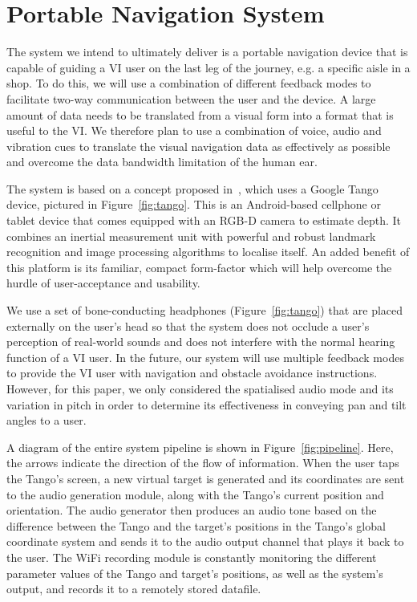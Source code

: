 \documentclass[format=sigconf, review=true, screen=true, anonymous=true]{acmart}
\begin{document}
\section{Portable Navigation System}
\label{sec:portable-navigation}

The system we intend to ultimately deliver is a portable navigation device that is capable of guiding a VI user on the last leg of the journey, e.g. a specific aisle in a shop. To do this, we will use a combination of different feedback modes to facilitate two-way communication between the user and the device. A large amount of data needs to be translated from a visual form into a format that is useful to the VI. We therefore plan to use a combination of voice, audio and vibration cues to translate the visual navigation data as effectively as possible and overcome the data bandwidth limitation of the human ear. 

The system is based on a concept proposed in~\cite{bellotto2013, lock2017portable}, which uses a Google Tango device, pictured in Figure~\ref{fig:tango}. This is an Android-based cellphone or tablet device that comes equipped with an RGB-D camera to estimate depth. It combines an inertial measurement unit with powerful and robust landmark recognition and image processing algorithms to localise itself. An added benefit of this platform is its familiar, compact form-factor which will help overcome the hurdle of user-acceptance and usability. 

We use a set of bone-conducting headphones (Figure~\ref{fig:tango}) that are placed externally on the user's head so that the system does not occlude a user's perception of real-world sounds and does not interfere with the normal hearing function of a VI user. In the future, our system will use multiple feedback modes to provide the VI user with navigation and obstacle avoidance instructions. However, for this paper, we only considered the spatialised audio mode and its variation in pitch in order to determine its effectiveness in conveying pan and tilt angles to a user.

A diagram of the entire system pipeline is shown in Figure~\ref{fig:pipeline}. Here, the arrows indicate the direction of the flow of information. When the user taps the Tango's screen, a new virtual target is generated and its coordinates are sent to the audio generation module, along with the Tango's current position and orientation. The audio generator then produces an audio tone based on the difference between the Tango and the target's positions in the Tango's global coordinate system and sends it to the audio output channel that plays it back to the user. The WiFi recording module is constantly monitoring the different parameter values of the Tango and target's positions, as well as the system's output, and records it to a remotely stored datafile. 
\end{document}
